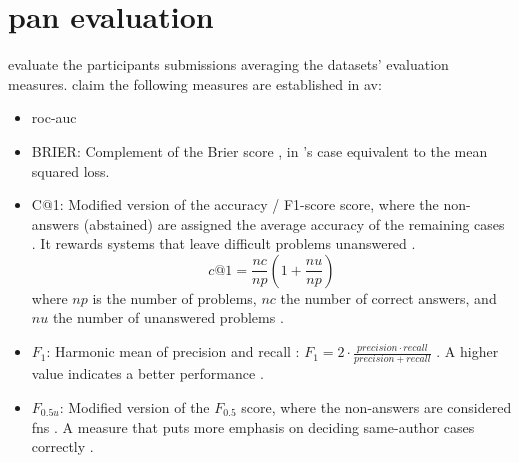 \section{\acs{pan} evaluation}
\label{sec:pan_evaluation}

\citet{ayele_overview_2024,bevendorff_overview_2024} evaluate the participants submissions averaging the datasets' evaluation measures.
\citet{ayele_overview_2024} claim the following measures are established in \ac{av}:
\begin{itemize}
    \item \ac{roc-auc} \cite{bevendorff_overview_2024,weerasinghe_feature_vector_difference_2021,kocher_unine_2015}
    
    \item BRIER: Complement of the Brier score \cite{bevendorff_overview_2024,weerasinghe_feature_vector_difference_2021}, in \citet{bevendorff_overview_2024}'s case equivalent to the mean squared loss.
    
    \item C@1: Modified version of the accuracy \cite{bevendorff_overview_2024}/ F1-score \cite{weerasinghe_feature_vector_difference_2021} score, 
    where the non-answers (abstained) \cite{llm_detection_av_2025} are assigned the average accuracy of the remaining cases \cite{bevendorff_overview_2024}. 
    It rewards systems that leave difficult problems unanswered \cite{weerasinghe_feature_vector_difference_2021}.
    $$c@1 = \frac{nc}{np}(1+\frac{nu}{np})$$ where $np$ is the number of problems, $nc$ the number of correct answers, 
    and $nu$ the number of unanswered problems \cite{kocher_unine_2015}.
    
    \item $F_1$: Harmonic mean of precision and recall \cite{bevendorff_overview_2024,weerasinghe_feature_vector_difference_2021}:
    $ F_1 = 2 \cdot \frac{precision \cdot recall}{precision + recall} $ \cite{neal_surveying_2018}.
    A higher value indicates a better performance \cite{neal_surveying_2018}.
    
    \item $F_{0.5u}$: Modified version of the $F_{0.5}$ score, where the non-answers are considered \acp{fn} \cite{bevendorff_overview_2024}. A measure that puts more emphasis on deciding same-author cases correctly \cite{weerasinghe_feature_vector_difference_2021}.
\end{itemize}

